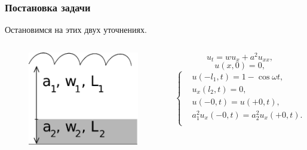 \documentclass[10pt,pdf,hyperref={unicode}]{beamer}
\begin{document}
\begin{frame}
  \frametitle{Постановка задачи}
  Остановимся на этих двух уточнениях.
  \begin{columns}
  \begin{figure}[ht]
    \begin{center}
      \includegraphics[width=5cm]{int4.eps}
    \end{center}
  \end{figure}
  \begin{equation*}
   u_t = wu_x + a^2 u_{xx},
  \end{equation*}
  \begin{equation*}
   u(x,0) = 0,
  \end{equation*}
  \begin{equation*}
    \left\{
    \begin{aligned}
      & u(-l_1,t) = 1 - \cos \omega t, \\
      & u_x(l_2,t) = 0, \\
      & u(-0, t) = u(+0, t), \\
      & a_1^2 u_{x}(-0, t) = a_2^2 u_{x}(+0, t). \\
    \end{aligned}
    \right.
  \end{equation*}
  \end{columns}
\end{frame}
\end{document}
